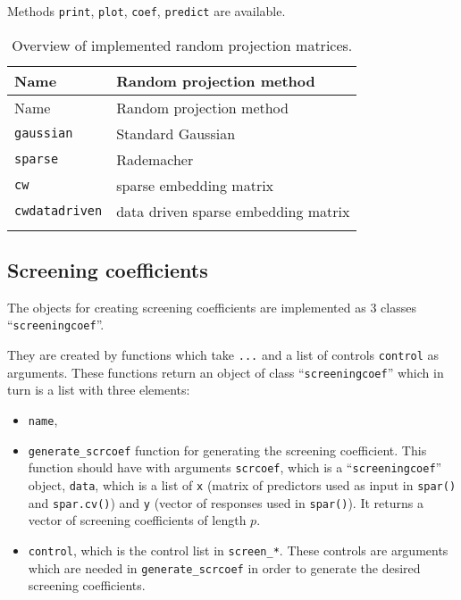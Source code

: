 \documentclass[
  article]{jss}
\begin{document}
Methods \texttt{print}, \texttt{plot}, \texttt{coef}, \texttt{predict}
are available.

\begin{longtable}[]{@{}ll@{}}
\toprule\noalign{}
Name & Random projection method \\
\midrule\noalign{}
\endfirsthead
\toprule\noalign{}
Name & Random projection method \\
\midrule\noalign{}
\endhead
\bottomrule\noalign{}
\endlastfoot
\texttt{gaussian} & Standard Gaussian \\
\texttt{sparse} & Rademacher \\
\texttt{cw} & sparse embedding matrix \\
\texttt{cwdatadriven} & data driven sparse embedding matrix \\
\caption{Overview of implemented random projection
matrices.}\label{tbl-overviewrp}\tabularnewline
\end{longtable}

\subsection{Screening coefficients}\label{screening-coefficients}

The objects for creating screening coefficients are implemented as
3 classes ``\texttt{screeningcoef}''.

They are created by functions which take \texttt{...} and a list of
controls \texttt{control} as arguments. These functions return an object
of class ``\texttt{screeningcoef}'' which in turn is a list with three
elements:

\begin{itemize}
\item
  \texttt{name},
\item
  \texttt{generate\_scrcoef} function for generating the screening
  coefficient. This function should have with arguments
  \texttt{scrcoef}, which is a ``\texttt{screeningcoef}'' object,
  \texttt{data}, which is a list of \texttt{x} (matrix of predictors
  used as input in \texttt{spar()} and \texttt{spar.cv()}) and
  \texttt{y} (vector of responses used in \texttt{spar()}). It returns a
  vector of screening coefficients of length \(p\).
\item
  \texttt{control}, which is the control list in \texttt{screen\_*}.
  These controls are arguments which are needed in
  \texttt{generate\_scrcoef} in order to generate the desired screening
  coefficients.
\end{itemize}
\end{document}
